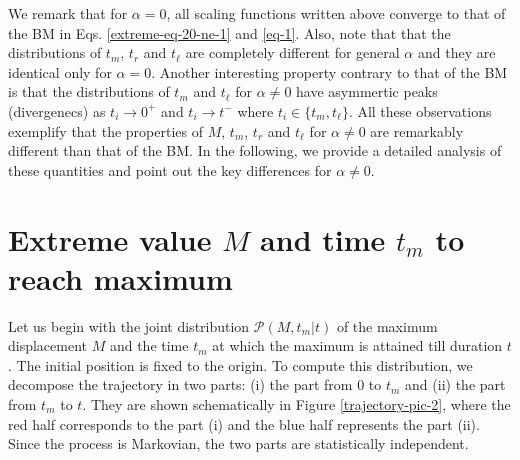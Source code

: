 \documentclass[showpacs,amsmath,amssymb,aps,pre,twocolumn,]{revtex4-1}
\begin{document}
We remark that for $\alpha =0$, all scaling functions written above converge to that of the BM in Eqs. \eqref{extreme-eq-20-ne-1} and \eqref{eq-1}. Also, note that that the distributions of $t_m$, $t_r$ and $t_{\ell}$ are completely different for general $\alpha$ and they are identical only for $\alpha =0$. Another interesting property contrary to that of the BM is that the distributions of $t_m$ and $t_{\ell}$ for $\alpha \neq 0$ have asymmertic peaks (divergenecs) as $t_i \to 0^+$ and $t_i \to t^-$ where $t_i \in \{t_m, t_{\ell} \}$. All these observations exemplify that the properties of $M$, $t_m$, $t_r$ and $t_{\ell}$ for $\alpha \neq 0$ are remarkably different than that of the BM. In the following, we provide a detailed 
analysis of these quantities and point out the key differences for $\alpha \neq 0$.

\section{Extreme value $M$ and time $t_m$ to reach maximum}
\label{extreme-statistics}
Let us begin with the joint distribution $\mathcal{P}(M, t_m|t)$ of the maximum displacement $M$ and the time $t_m$ at which the maximum is attained till duration $t$. The initial position is fixed to the origin. To compute this distribution, we decompose the trajectory in two parts: (i) the part from $0$ to $t_m$ and (ii) the part from $t_m$ to $t$. They are shown schematically in Figure \ref{trajectory-pic-2}, where the red half corresponds to the part (i) and the blue half represents the part (ii). Since the process is Markovian, the two parts are statistically independent.
\end{document}
